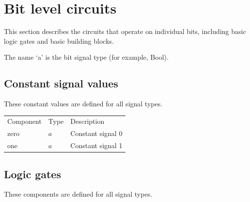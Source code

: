 \documentclass[a4paper,openany,fleqn]{book}
\begin{document}
\section{Bit level circuits}
\label{sec:bit-level-circuits}

This section describes the circuits that operate on individual bits,
including basic logic gates and basic building blocks.

The name `a' is the bit signal type (for example, Bool).



\subsection{Constant signal values}
\label{sec:const-sign-valu}

These constant values are defined for all signal types.

\begin{tabular}[c]{lll}
Component & Type & Description \\
zero & $a$ & Constant signal 0 \\
one  & $a$ & Constant signal 1
\end{tabular}


\subsection{Logic gates}
\label{sec:logic-gates-1}

These components are defined for all signal types.
\end{document}
